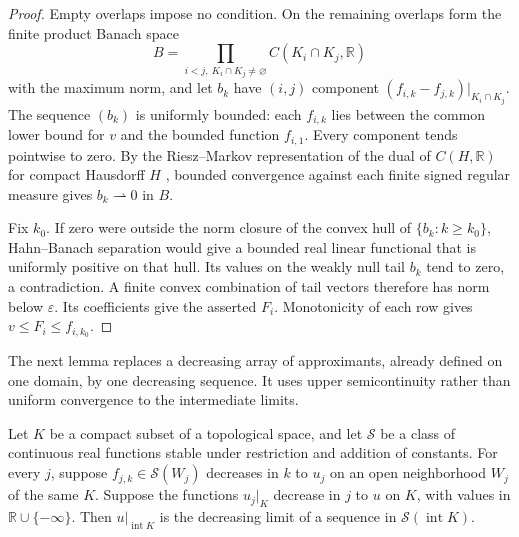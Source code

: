 \begin{proof}
Empty overlaps impose no condition. On the remaining overlaps form the finite product Banach space
\[
B=\prod_{i<j,\ K_i\cap K_j\ne\varnothing} C(K_i\cap K_j,\mathbb{R})
\]
with the maximum norm, and let $b_k$ have $(i,j)$ component $(f_{i,k}-f_{j,k})|_{K_i\cap K_j}$. The sequence $(b_k)$ is uniformly bounded: each $f_{i,k}$ lies between the common lower bound for $v$ and the bounded function $f_{i,1}$. Every component tends pointwise to zero. By the Riesz--Markov representation of the dual of $C(H,\mathbb{R})$ for compact Hausdorff $H$ \cite[Theorem~18.1]{SchenkerFA}, bounded convergence against each finite signed regular measure gives $b_k\rightharpoonup0$ in $B$.

Fix $k_0$. If zero were outside the norm closure of the convex hull of $\{b_k:k\geq k_0\}$, Hahn--Banach separation \cite[Theorem~2.1]{ButtenschoenHB} would give a bounded real linear functional that is uniformly positive on that hull. Its values on the weakly null tail $b_k$ tend to zero, a contradiction. A finite convex combination of tail vectors therefore has norm below $\varepsilon$. Its coefficients give the asserted $F_i$. Monotonicity of each row gives $v\leq F_i\leq f_{i,k_0}$.
\end{proof}

The next lemma replaces a decreasing array of approximants, already defined on one domain, by one decreasing sequence. It uses upper semicontinuity rather than uniform convergence to the intermediate limits.

\begin{lemma}
\label{lem:supplied-p071a-fixed-domain-diagonal}
Let $K$ be a compact subset of a topological space, and let $\mathscr{S}$ be a class of continuous real functions stable under restriction and addition of constants. For every $j$, suppose $f_{j,k}\in\mathscr{S}(W_j)$ decreases in $k$ to $u_j$ on an open neighborhood $W_j$ of the same $K$. Suppose the functions $u_j|_K$ decrease in $j$ to $u$ on $K$, with values in $\mathbb{R}\cup\{-\infty\}$. Then $u|_{\operatorname{int}K}$ is the decreasing limit of a sequence in $\mathscr{S}(\operatorname{int}K)$.
\end{lemma}

